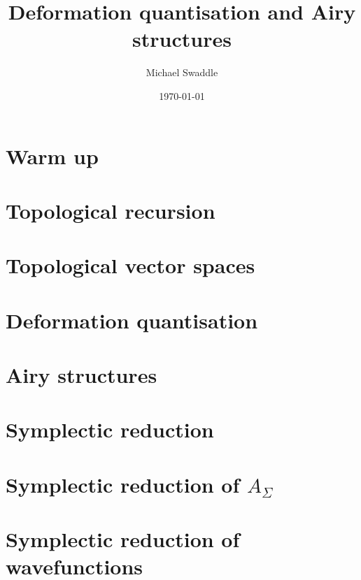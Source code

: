 \documentclass{beamer}
\title{Deformation quantisation and Airy structures}
\author{Michael Swaddle}
\institute{University of Melbourne}
\date{\today}
\begin{document}
    \begin{frame}
        \titlepage
    \end{frame}
    

    \section{Warm up}
        
         

    \section{Topological recursion}
    
    
        
    
    \section{Topological vector spaces}
        
        
    
    \section{Deformation quantisation}
        
    
    \section{Airy structures}
        

    \section{Symplectic reduction}
        
    
    \section{Symplectic reduction of \texorpdfstring{\(A_\Sigma\)}{A Sigma}}
        
    
    \section{Symplectic reduction of wavefunctions}      
\end{document}
